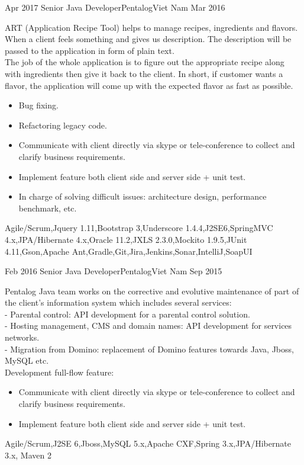 \begin{experiences}
\experience
  {Apr 2017}  {Senior Java Developer}{Pentalog}{Viet Nam}
  {Mar 2016}  {  
ART (Application Recipe Tool) helps to manage recipes, ingredients and flavors. When a client feels something and gives us description. The description will be passed to the application in form of plain text.\\
The job of the whole application is to figure out the appropriate recipe along with ingredients then give it back to the client. In short, if customer wants a flavor, the application will come up with the expected flavor as fast as possible.
	\begin{itemize}
        \item Bug fixing.       
        \item Refactoring legacy code.                          
        \item Communicate with client directly via skype or tele-conference to collect and clarify business requirements.
        \item Implement feature both client side and server side + unit test.       
        \item In charge of solving difficult issues: architecture design, performance benchmark, etc.                          
	\end{itemize}
}
{Agile/Scrum,Jquery 1.11,Bootstrap 3,Underscore 1.4.4,J2SE6,SpringMVC 4.x,JPA/Hibernate 4.x,Oracle 11.2,JXLS 2.3.0,Mockito 1.9.5,JUnit 4.11,Gson,Apache Ant,Gradle,Git,Jira,Jenkins,Sonar,IntelliJ,SoapUI}
\emptySeparator

\experience
  {Feb 2016}  {Senior Java Developer}{Pentalog}{Viet Nam}
  {Sep 2015}  {  
Pentalog Java team works on the corrective and evolutive maintenance of part of the client’s information system which includes several services:\\
- Parental control: API development for a parental control solution.\\
- Hosting management, CMS and domain names: API development for services networks.\\
- Migration from Domino: replacement of Domino features towards Java, Jboss, MySQL etc.\\
[0.2 cm]
Development full-flow  feature:
	\begin{itemize}
        \item Communicate with client directly via skype or tele-conference to collect and clarify business requirements.       
        \item Implement feature both client side and server side + unit test.                          
	\end{itemize}
}
{Agile/Scrum,J2SE 6,Jboss,MySQL 5.x,Apache CXF,Spring 3.x,JPA/Hibernate 3.x, Maven 2}
\emptySeparator


\end{experiences}
